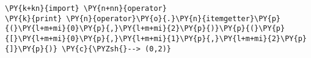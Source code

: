 \begin{Verbatim}[commandchars=\\\{\}]
\PY{k+kn}{import} \PY{n+nn}{operator}
\PY{k}{print} \PY{n}{operator}\PY{o}{.}\PY{n}{itemgetter}\PY{p}{(}\PY{l+m+mi}{0}\PY{p}{,}\PY{l+m+mi}{2}\PY{p}{)}\PY{p}{(}\PY{p}{[}\PY{l+m+mi}{0}\PY{p}{,}\PY{l+m+mi}{1}\PY{p}{,}\PY{l+m+mi}{2}\PY{p}{]}\PY{p}{)} \PY{c}{\PYZsh{}--> (0,2)}
\end{Verbatim}
